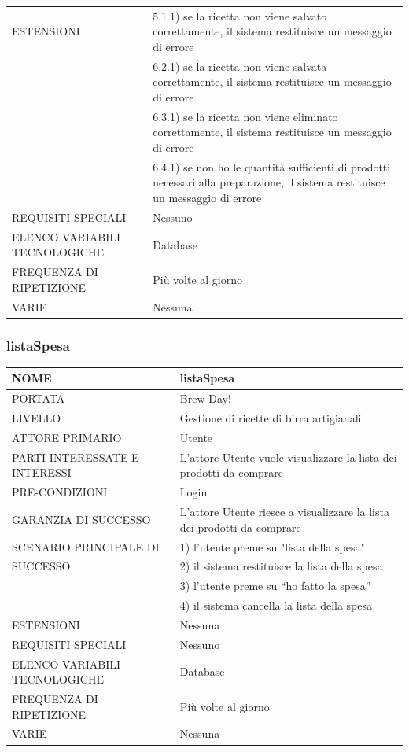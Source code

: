 \documentclass[a4paper, titlepage]{article}
\begin{document}
\begin{longtable}{p{6cm}p{7cm}}
    ESTENSIONI
    & 5.1.1) se la ricetta non viene salvato correttamente, il sistema restituisce un messaggio di errore\\
    & 6.2.1) se la ricetta non viene salvata correttamente, il sistema restituisce un messaggio di errore\\
    & 6.3.1) se la ricetta non viene eliminato correttamente, il sistema restituisce un messaggio di errore \\
    & 6.4.1) se non ho le quantità sufficienti di prodotti necessari alla preparazione, il sistema restituisce un messaggio di errore\\\midrule
    REQUISITI SPECIALI & Nessuno\\\midrule
    ELENCO VARIABILI TECNOLOGICHE & Database\\\midrule
    FREQUENZA DI RIPETIZIONE & Più volte al giorno\\\midrule
    VARIE & Nessuna\\\bottomrule
\end{longtable}
\vphantom{}
\subsubsection{listaSpesa}
\begin{longtable}{p{6cm}p{7cm}}\toprule
    NOME & listaSpesa\\\midrule
    PORTATA & Brew Day!\\\midrule
    LIVELLO & Gestione di ricette di birra artigianali\\\midrule
    ATTORE PRIMARIO & Utente\\\midrule
    PARTI INTERESSATE E INTERESSI & L’attore Utente vuole visualizzare la lista dei prodotti da comprare\\\midrule
    PRE-CONDIZIONI & Login\\\midrule
    GARANZIA DI SUCCESSO & L’attore Utente riesce a  visualizzare la lista dei prodotti da comprare\\\midrule
    SCENARIO PRINCIPALE DI
    & 1) l'utente preme su "lista della spesa"\\
    SUCCESSO & 2) il sistema restituisce la lista della spesa\\
    & 3) l’utente preme su “ho fatto la spesa”\\
    & 4) il sistema cancella la lista della spesa\\\midrule
    ESTENSIONI & Nessuna\\\midrule
    REQUISITI SPECIALI & Nessuno\\\midrule
    ELENCO VARIABILI TECNOLOGICHE & Database\\\midrule
    FREQUENZA DI RIPETIZIONE & Più volte al giorno\\\midrule
    VARIE & Nessuna\\\bottomrule
\end{longtable}
\vphantom{}
\newpage
\end{document}
